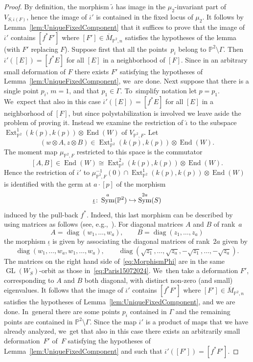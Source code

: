 \documentclass[JEP,XML,SOM,Unicode,published]{cedram}
\newcommand\hto{\mathrel{\lhook\joinrel\to}}
\newcommand{\PP}{{\mathbb P}}\let\P\PP
\DeclareMathOperator{\diag}{diag}
\DeclareMathOperator{\End}{End}
\DeclareMathOperator{\Ext}{Ext}
\DeclareMathOperator{\GL}{GL}
\DeclareMathOperator{\Sym}{Sym}
\let\ov\overline
\let\wh\widehat
\theoremstyle{definition}
\begin{document}
\begin{proof}
By definition, the morphism $\widetilde{\iota}$ has image in the $\mu_2$-invariant part of $V_{S,\overline{\iota}(F)}$, hence the image of $\overline{\iota}'$ is contained in the fixed locus of $\mu_2$. It follows by Lemma~\ref{lem:UniqueFixedComponent} that it suffices to prove that the image of $\overline{\iota}'$ contains $[f^{*}F']$ where $[F']\in\overline{M}_{\PP^2,n}$ satisfies the hypotheses of the lemma (with $F'$ replacing $F$).
Suppose first that all the points~$p_i$ belong to $\PP^2\setminus\Gamma$. Then
$\ov{\iota}'([E])=[f^{*}E]$ for all $[E]$ in a neighborhood of $[F]$. Since in an arbitrary small deformation of $F$ there exists $F'$ satisfying the hypotheses of Lemma~\ref{lem:UniqueFixedComponent}, we~are done. Next suppose that there is a single point $p_i$, \ie $m=1$, and that $p_1\in\Gamma$. To~simplify notation let $p=p_1$. We~expect that also in this case
$\ov{\iota}'([E])=[f^{*}E]$ for all $[E]$ in a neighborhood of $[F]$, but since polystabilization is involved we leave aside the problem of proving it. Instead we examine the restriction of $\wh{\iota}$ to the subspace
$\Ext^1_{\PP^2}(k(p),k(p))\otimes \End(W)$ of $V_{\PP^2,F}$.
Let
\[
(w\otimes A,z\otimes B)\in\Ext^1_{\PP^2}(k(p),k(p))\otimes \End(W).
\]
The moment map $\mu_{\PP^2,F}$ restricted to this space is the commutator
\[
\left[A,B\right]\in\End(W)\cong\Ext^2_{\PP^2}(k(p),k(p))\otimes \End(W).
\]
Hence the restriction of $\overline{\iota}'$ to $\mu_{\PP^2,F}^{-1}(0)\cap \Ext^1_{\PP^2}(k(p),k(p))\otimes \End(W)$ is identified with the germ at $a\cdot [p]$ of the morphism
\[
\underline{\iota}\colon \Sym^{a}(\PP^2)\hto\Sym^{2a}(S)
\]
induced by the pull-back $f^*$.
Indeed, this last morphism can be described by using matrices as follows (see, e.g.,~\cite[\S 1.4]{Nakajima:book}).
For diagonal matrices $A$ and $B$ of rank~$a$
\[
A=\diag(w_1,\dots,w_a), \qquad B=\diag(z_1,\dots,z_a)
\]
the morphism $\underline{\iota}$ is given by associating the diagonal matrices of rank~$2a$ given by
\begin{equation}\label{eq:Paris15072024}
\diag(w_1,\dots,w_a,w_1,\dots,w_a), \qquad \diag(\sqrt{z_1},\dots,\sqrt{z_a},-\sqrt{z_1},\dots,-\sqrt{z_a}).
\end{equation}
The matrices on the right hand side of~\eqref{eq:MorphismPhi} are in the same $\GL(W_S)$-orbit as those in~\eqref{eq:Paris15072024}. We~then take a deformation $F'$, corresponding to $A$ and $B$ both diagonal, with distinct non-zero (and small) eigenvalues. It follows that the image of $\ov{\iota}'$ contains $[f^{*}F']$ where $[F']\in\overline{M}_{\PP^2,n}$ satisfies the hypotheses of
Lemma~\ref{lem:UniqueFixedComponent}, and we are done. In~general there are some points $p_i$ contained in $\Gamma$ and the remaining points are contained in $\PP^2\setminus\Gamma$. Since the map $\ov{\iota}'$ is a product of maps that we have already analyzed, we~get that also in this case there exists an arbitrarily small deformation~$F'$ of~$F$ satisfying the hypotheses of Lemma~\ref{lem:UniqueFixedComponent} and such that $\ov{\iota}'([F'])=[f^{*}F']$.
\end{proof}
\end{document}
